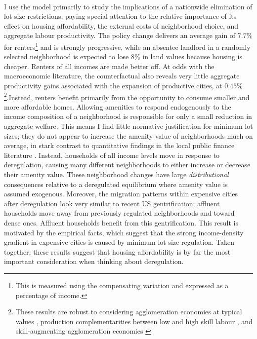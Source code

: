 \documentclass[11pt]{article}
\begin{document}
	\paragraph*{}
	I use the model primarily to study the implications of a nationwide elimination of lot size restrictions, paying special attention to the relative importance of its effect on housing affordability, the external costs of neighborhood choice, and aggregate labour productivity. The policy change delivers an average gain of $7.7 \%$ for renters\footnote{This is measured using the compensating variation and expressed as a percentage of income.} and is strongly progressive, while an absentee landlord in a randomly selected neighborhood is expected to lose $8 \%$ in land values because housing is cheaper. Renters of all incomes are made better off. At odds with the macroeconomic literature, the counterfactual also reveals very little aggregate productivity gains associated with the expansion of productive cities, at $0.45 \%$\footnote{These results are robust to considering agglomeration economies at typical values \citep{Combes_review}, production complementarities between low and high skill labour \citep{card}, and skill-augmenting agglomeration economies \citep{diamond2016, ineqincreased}}.Instead, renters benefit primarily from the opportunity to consume smaller and more affordable homes. Allowing amenities to respond endogenously to the income composition of a neighborhood is responsible for only a small reduction in aggregate welfare. This means I find little normative justification for minimum lot sizes; they do not appear to increase the amenity value of neighborhoods much on average, in stark contrast to quantitative findings in the local public finance literature \citep{calabresetal, ineffTiebout}. Instead, households of all income levels move in response to deregulation, causing many different neighborhoods to either increase or decrease their amenity value. These neighborhood changes have large \textit{distributional} consequences relative to a deregulated equilibrium where amenity value is assumed exogenous. Moreover, the migration patterns within expensive cities after deregulation look very similar to recent US gentrification; affluent households move away from previously regulated neighborhoods and toward dense ones. Affluent households benefit from this gentrification. This result is motivated by the empirical facts, which suggest that the strong income-density gradient in expensive cities is caused by minimum lot size regulation. Taken together, these results suggest that housing affordability is by far the most important consideration when thinking about deregulation. 
	
\end{document}
